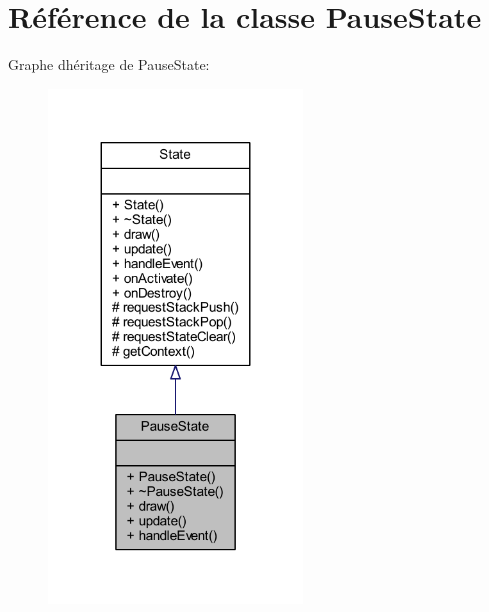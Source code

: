 \hypertarget{class_pause_state}{}\section{Référence de la classe Pause\+State}
\label{class_pause_state}


Graphe d\textquotesingle{}héritage de Pause\+State\+:\nopagebreak
\begin{figure}[H]
\begin{center}
\leavevmode
\includegraphics[width=191pt]{class_pause_state__inherit__graph}
\end{center}
\end{figure}



